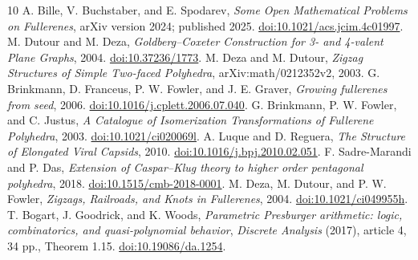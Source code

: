 \documentclass[11pt]{amsart}
\begin{document}
\clearpage
\begin{thebibliography}{10}
 A. Bille, V. Buchstaber, and E. Spodarev,
\emph{Some Open Mathematical Problems on Fullerenes}, arXiv version
2024; published 2025. \href{https://doi.org/10.1021/acs.jcim.4c01997}{doi:10.1021/acs.jcim.4c01997}.
 M. Dutour and M. Deza,
\emph{Goldberg--Coxeter Construction for 3- and 4-valent Plane Graphs},
2004. \href{https://doi.org/10.37236/1773}{doi:10.37236/1773}.
 M. Deza and M. Dutour,
\emph{Zigzag Structures of Simple Two-faced Polyhedra},
arXiv:math/0212352v2, 2003.
 G. Brinkmann, D. Franceus, P. W. Fowler, and J. E. Graver,
\emph{Growing fullerenes from seed}, 2006.
\href{https://doi.org/10.1016/j.cplett.2006.07.040}{doi:10.1016/j.cplett.2006.07.040}.
 G. Brinkmann, P. W. Fowler, and C. Justus,
\emph{A Catalogue of Isomerization Transformations of Fullerene Polyhedra},
2003. \href{https://doi.org/10.1021/ci020069l}{doi:10.1021/ci020069l}.
 A. Luque and D. Reguera,
\emph{The Structure of Elongated Viral Capsids}, 2010.
\href{https://doi.org/10.1016/j.bpj.2010.02.051}{doi:10.1016/j.bpj.2010.02.051}.
 F. Sadre-Marandi and P. Das,
\emph{Extension of Caspar--Klug theory to higher order pentagonal polyhedra},
2018. \href{https://doi.org/10.1515/cmb-2018-0001}{doi:10.1515/cmb-2018-0001}.
 M. Deza, M. Dutour, and P. W. Fowler,
\emph{Zigzags, Railroads, and Knots in Fullerenes}, 2004.
\href{https://doi.org/10.1021/ci049955h}{doi:10.1021/ci049955h}.
 T. Bogart, J. Goodrick, and K. Woods,
\emph{Parametric Presburger arithmetic: logic, combinatorics, and
quasi-polynomial behavior}, \emph{Discrete Analysis} (2017),
article 4, 34 pp., Theorem 1.15.
\href{https://doi.org/10.19086/da.1254}{doi:10.19086/da.1254}.
\end{thebibliography}
\end{document}
